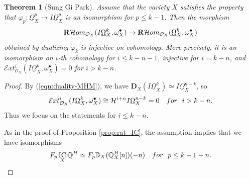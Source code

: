 \documentclass[11pt]{amsart}
\newtheorem{theorem}[equation]{Theorem}
\theoremstyle{definition}
\theoremstyle{plain}
\newcommand{\D}{\mathcal D}
\newcommand{\E}{\mathcal E}
\renewcommand{\H}{\mathcal H}
\renewcommand{\O}{\mathcal O}
\newcommand{\QQ}{\mathbb Q}
\newcommand{\DDD}{\mathbb D}
\newcommand{\DD}{\mathbf D}
\newcommand{\RHom}{{\bf R} \H om}
\newcommand{\sExt}{\E xt} %
\newcommand{\DB}{\underline{\Omega}} %
\DeclareMathOperator{\DR}{DR}
\DeclareMathOperator{\IC}{IC}
\DeclareMathOperator{\gr}{{\rm gr}}
\begin{document}
\begin{theorem}[{Sung Gi Park}]\label{thm:injectivity-Rk}
Assume that the variety $X$ satisfies the property that $\varphi_p \colon \DB_X^p \to I\DB_X^p$ is an isomorphism for $p \le k-1$. 
Then the morphism
$$\RHom_{\O_X}(I\DB_X^k,\omega_X^{\bullet}) \to \RHom_{\O_X}(\DB_X^k,\omega_X^{\bullet})$$
obtained by dualizing $\varphi_k$ is injective on cohomology. 
More precisely, it is an isomorphism on $i$-th cohomology for $i \le k-n - 1$, injective for $i= k- n$, and $\sExt^i_{\O_X}(I\DB_X^k,\omega_X^{\bullet}) = 0$ for $i >k - n$.
\end{theorem}
\begin{proof}  
By (\ref{eqn:duality-MHM}), we have $\DD_X (I\DB_X^k) \simeq I\DB_X^{n-k}$, so
$$\E xt^i_{\O_X}(I\DB_X^k, \omega_X^{\bullet}) \cong \H^{i+n} I\DB_X^{n-k}  =  0 \,\,\,\,\,\,{\rm for}\,\,\,\, i > k - n.$$
Thus we focus on the statements for $i \le k -n$.
	

As in the proof of Proposition \ref{prop:rat_IC}, the assumption implies that we have
isomorphisms 
\begin{equation}\label{eqn:HF}
	F_{p} \IC_X\QQ^H  \simeq F_{p} \DDD_X(\QQ^H_X[n])(-n)  \,\,\,\,\,\,{\rm for}\,\,\,\, p \le k-1-n.
\end{equation}


\end{proof}
\end{document}
